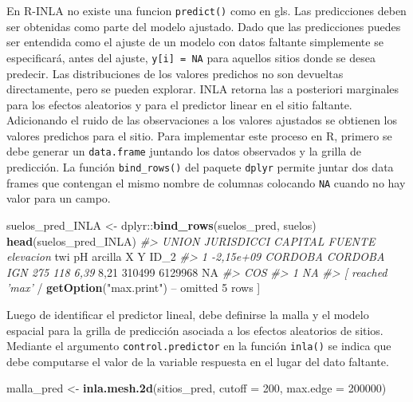 \documentclass[11pt,b5paper,]{krantz}
\newenvironment{Shaded}{}{}
\newcommand{\KeywordTok}[1]{\textcolor[rgb]{0.00,0.44,0.13}{\textbf{#1}}}
\newcommand{\DataTypeTok}[1]{\textcolor[rgb]{0.56,0.13,0.00}{#1}}
\newcommand{\DecValTok}[1]{\textcolor[rgb]{0.25,0.63,0.44}{#1}}
\newcommand{\StringTok}[1]{\textcolor[rgb]{0.25,0.44,0.63}{#1}}
\newcommand{\CommentTok}[1]{\textcolor[rgb]{0.38,0.63,0.69}{\textit{#1}}}
\newcommand{\OtherTok}[1]{\textcolor[rgb]{0.00,0.44,0.13}{#1}}
\newcommand{\OperatorTok}[1]{\textcolor[rgb]{0.40,0.40,0.40}{#1}}
\newcommand{\NormalTok}[1]{#1}
\begin{document}
En R-INLA no existe una funcion \texttt{predict()} como en gls. Las
predicciones deben ser obtenidas como parte del modelo ajustado. Dado
que las predicciones puedes ser entendida como el ajuste de un modelo
con datos faltante simplemente se especificará, antes del ajuste,
\texttt{y{[}i{]}\ =\ NA} para aquellos sitios donde se desea predecir.
Las distribuciones de los valores predichos no son devueltas
directamente, pero se pueden explorar. INLA retorna las a posteriori
marginales para los efectos aleatorios y para el predictor linear en el
sitio faltante. Adicionando el ruido de las observaciones a los valores
ajustados se obtienen los valores predichos para el sitio. Para
implementar este proceso en R, primero se debe generar un
\texttt{data.frame} juntando los datos observados y la grilla de
predicción. La función \texttt{bind\_rows()} del paquete \texttt{dplyr}
permite juntar dos data frames que contengan el mismo nombre de columnas
colocando \texttt{NA} cuando no hay valor para un campo.

\begin{Shaded}
\begin{Highlighting}[]
\NormalTok{suelos_pred_INLA <-}\StringTok{ }\NormalTok{dplyr}\OperatorTok{::}\KeywordTok{bind_rows}\NormalTok{(suelos_pred,}
\NormalTok{                                     suelos)}
\KeywordTok{head}\NormalTok{(suelos_pred_INLA)}
\CommentTok{#> UNION JURISDICCI CAPITAL FUENTE elevacion}
\NormalTok{twi pH arcilla X Y ID_}\DecValTok{2}
\CommentTok{#> 1 -2,15e+09 CORDOBA CORDOBA IGN 275 118 6,39}
\DecValTok{8}\NormalTok{,}\DecValTok{21} \DecValTok{310499} \DecValTok{6129968} \OtherTok{NA}
\CommentTok{#> COS}
\CommentTok{#> 1 NA}
\CommentTok{#> [ reached 'max'}
    \OperatorTok{/}\StringTok{ }\KeywordTok{getOption}\NormalTok{(}\StringTok{"max.print"}\NormalTok{) }\OperatorTok{--}
\NormalTok{omitted }\DecValTok{5}\NormalTok{ rows ]}
\end{Highlighting}
\end{Shaded}

Luego de identificar el predictor lineal, debe definirse la malla y el
modelo espacial para la grilla de predicción asociada a los efectos
aleatorios de sitios. Mediante el argumento \texttt{control.predictor}
en la función \texttt{inla()} se indica que debe computarse el valor de
la variable respuesta en el lugar del dato faltante.

\begin{Shaded}
\begin{Highlighting}[]
\NormalTok{malla_pred <-}\StringTok{ }\KeywordTok{inla.mesh.2d}\NormalTok{(sitios_pred, }
                           \DataTypeTok{cutoff =} \DecValTok{200}\NormalTok{,}
                           \DataTypeTok{max.edge =} \DecValTok{200000}\NormalTok{)}
\end{Highlighting}
\end{Shaded}
\end{document}
